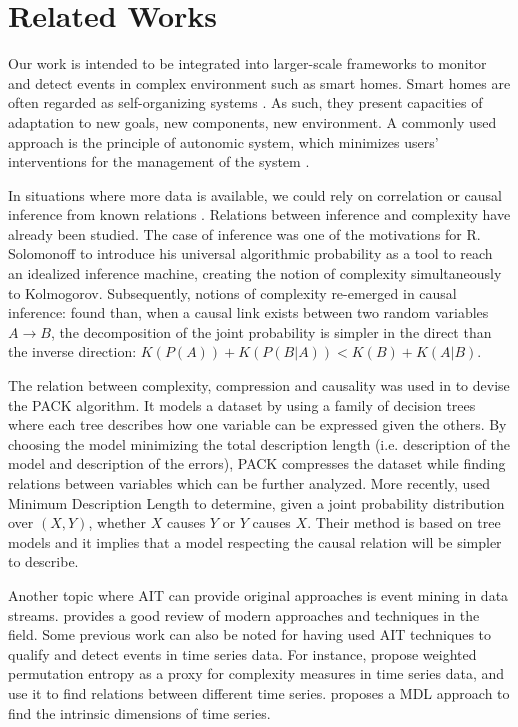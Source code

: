 \documentclass[entropy,article,submit,moreauthors,pdftex]{Definitions/mdpi}
\begin{document}
\section{Related Works}
\label{sec:related}
Our work is intended to be integrated into larger-scale frameworks to monitor
and detect events in complex environment such as smart homes. Smart homes are often regarded as self-organizing systems \cite{kramer_rigorous_2009,kounev_notion_2017}. As such, they present capacities of adaptation to new goals,
new components, new environment. A commonly used approach is the principle of
autonomic system, which minimizes users' interventions for the management of the
system \cite{kounev_notion_2017,kephart_vision_2003}.

In situations where more data is available, we could rely
on correlation or causal inference from known relations \cite{peters_elements_2017,fadiga_or_2021}. Relations between inference and complexity have already been studied. The
case of inference was one of the motivations for R. Solomonoff to introduce his
universal algorithmic probability \cite{solomonoff_formal_1964} as a tool to
reach an idealized inference machine, creating the notion of complexity simultaneously
to Kolmogorov. Subsequently, notions of complexity re-emerged in causal inference:
\cite{janzing_causal_2010} found than, when a causal link exists between two random variables $A \rightarrow B$, the decomposition of the joint probability is simpler in the direct than the inverse direction: $K(P(A)) + K(P(B|A)) < K(B) + K(A|B)$.

The relation between complexity, compression and causality was used in \cite{tatti_finding_2008} to devise the PACK algorithm. It models a dataset by using a family of decision trees where each tree describes how one variable can be expressed given the others. By choosing the model minimizing the total description length (i.e. description of the model and description of the errors), PACK compresses the dataset while finding relations between variables which can be further analyzed. More recently, \cite{marx_causal_2018} used Minimum Description Length to determine, given a joint probability distribution over $(X,Y)$, whether $X$ causes $Y$ or $Y$ causes $X$. Their method is based on tree models and it implies that a model respecting the causal relation will be simpler to describe.


Another topic where AIT can provide original approaches is event mining in data streams.
\cite{aggarwal_outlier_2017} provides a good review of modern approaches and techniques
in the field. Some previous work can also be noted for having used AIT techniques to qualify and detect events in time series data. For instance, \cite{batista_complexity-invariant_2011,fadlallah_weighted-permutation_2013} propose weighted permutation entropy as a proxy for complexity measures in time series data, and use it to find relations between different time series. \cite{hu_discovering_2011} proposes a MDL approach to find the intrinsic dimensions of time series.
\end{document}
